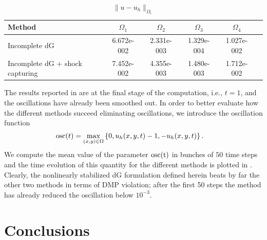 \begin{table}
\centering
\begin{tabular}{lccccc}
\hline
Method &  $\Omega_1$ &  $\Omega_2$ &  $\Omega_3$ &  $\Omega_4$\\\hline
Incomplete dG &  6.672e-002 & 2.331e-003 & 1.329e-004 &   1.027e-002\\
Incomplete dG + shock capturing &   7.452e-002 & 4.355e-003 & 1.480e-003 & 1.712e-002\\
\hline
\end{tabular}
\caption{ $\|u-u_h\|_{\Omega_i}$}\label{tab-ex15_malla2D_new_2}
\end{table}
The results reported in  are at the final stage of the computation, i.e., $t=1$, and the oscillations have already been smoothed out. In order to better evaluate how the different methods succeed eliminating oscillations, we introduce the oscillation function
\begin{align*}
&{\rm osc}(t) = \max_{(x,y)\in \Omega} \left\{0 , u_h(x,y,t) - 1 , -u_h(x,y,t) \right\}.
\end{align*}
We compute the mean value of the parameter ${\rm osc(t)}$ in bunches of $50$ time steps and the time evolution of this quantity for the different methods is plotted in . Clearly, the nonlinearly stabilized dG formulation defined herein beats by far the other two methods in terms of DMP violation; after the first 50 steps the method has already reduced the oscillation below $10^{-3}$.  

\section{Conclusions}\label{s-concl_2}


